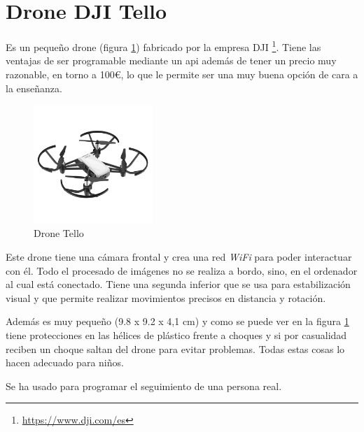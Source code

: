 \section{Drone DJI Tello}
Es un pequeño drone (figura \ref{fig:tello}) fabricado por la empresa DJI \footnote{\url{https://www.dji.com/es}}. Tiene las ventajas de ser programable mediante un \acrshort{api} además de tener un precio muy razonable, en torno a 100€, lo que le permite ser una muy buena opción de cara a la enseñanza.
\begin{figure}[H]
  \begin{center}
    \includegraphics[width=0.4\textwidth]{figures/herramientas/tello.png}
		\caption{Drone Tello}
		\label{fig:tello}
		\end{center}
\end{figure}
Este drone tiene una cámara frontal y crea una red \textit{WiFi} para poder interactuar con él. Todo el procesado de imágenes no se realiza a bordo, sino, en el ordenador al cual está conectado. Tiene una segunda inferior que se usa para estabilización visual y que permite realizar movimientos precisos en distancia y rotación.

Además es muy pequeño (9.8 x 9.2 x 4,1 cm) y como se puede ver en la figura \ref{fig:tello} tiene protecciones en las hélices de plástico frente a choques y si por casualidad reciben un choque saltan del drone para evitar problemas. Todas estas cosas lo hacen adecuado para niños.

Se ha usado para programar el seguimiento de una persona real.
